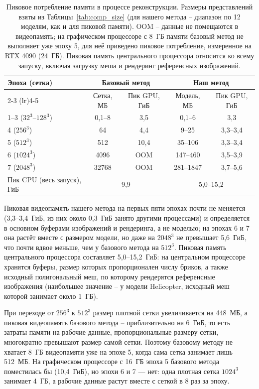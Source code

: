 \begin{table}[ht]
    \centering
    \small
    \setlength{\tabcolsep}{4pt}
    \caption{Пиковое потребление памяти в процессе реконструкции. Размеры представлений взяты из Таблицы~\ref{tab:comp_size} (для нашего метода -- диапазон по 12 моделям, как и для пиковой памяти). OOM -- данные не помещаются в видеопамять; на графическом процессоре с 8~ГБ памяти базовый метод не выполняет уже эпоху 5, для неё приведено пиковое потребление, измеренное на RTX 4090 (24~ГБ). Пиковая память центрального процессора относится ко всему запуску, включая загрузку меша и рендеринг референсных изображений.}
    \label{tab:comp_mem}
    \begin{tabular}{lcccc}
        \toprule
        Эпоха (сетка) & \multicolumn{2}{c}{Базовый метод} & \multicolumn{2}{c}{Наш метод} \\
        \cmidrule(lr){2-3} \cmidrule(lr){4-5}
         & Сетка, МБ & Пик GPU, ГиБ & Модель, МБ & Пик GPU, ГиБ \\
        \midrule
        1--3 ($32^3$--$128^3$) & 0,1--8 & 3,5 & 0,1--6 & 3,3 \\
        4 ($256^3$) & 64 & 4,4 & 9--25 & 3,3--3,4 \\
        5 ($512^3$) & 512 & 10,4 & 35--106 & 3,3--3,4 \\
        6 ($1024^3$) & 4096 & OOM & 147--460 & 3,5--3,9 \\
        7 ($2048^3$) & 32768 & OOM & 281--1847 & 3,7--5,6 \\
        \midrule
        Пик CPU (весь запуск), ГиБ & \multicolumn{2}{c}{9,9} & \multicolumn{2}{c}{5,0--15,2} \\
        \bottomrule
    \end{tabular}
\end{table}

Пиковая видеопамять нашего метода на первых пяти эпохах почти не меняется (3,3--3,4~ГиБ, из них около 0,3~ГиБ занято другими процессами) и определяется в основном буферами изображений и рендеринга, а не моделью; на эпохах 6 и 7 она растёт вместе с размером модели, но даже на $2048^3$ не превышает 5,6~ГиБ, что почти вдвое меньше, чем у базового метода на $512^3$. Пиковая память центрального процессора составляет 5,0--15,2~ГиБ: на центральном процессоре хранятся буферы, размер которых пропорционален числу бриков, а также исходный полигональный меш, по которому рендерятся референсные изображения (наибольшее значение -- у модели Helicopter, исходный меш которой занимает около 1~ГБ).

При переходе от $256^3$ к $512^3$ размер плотной сетки увеличивается на 448~МБ, а пиковая видеопамять базового метода -- приблизительно на 6~ГиБ, то есть затраты памяти на рабочие данные, пропорциональные размеру сетки, многократно превышают размер самой сетки. Поэтому базовому методу не хватает 8~ГБ видеопамяти уже на эпохе 5, когда сама сетка занимает лишь 512~МБ. На графическом процессоре с 16~ГБ эпоха 5 базового метода поместилась бы (10,4~ГиБ), но эпохи 6 и 7 --- нет: одна плотная сетка $1024^3$ занимает 4~ГБ, а рабочие данные растут вместе с сеткой в 8 раз за эпоху.

